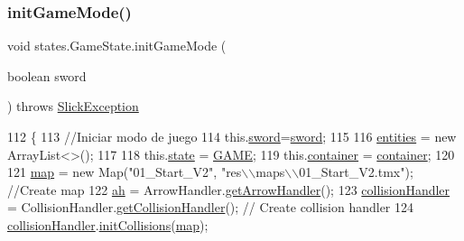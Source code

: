 \subsubsection{\texorpdfstring{init\+Game\+Mode()}{initGameMode()}}
{\footnotesize\ttfamily void states.\+Game\+State.\+init\+Game\+Mode (\begin{DoxyParamCaption}\item[{boolean}]{sword }\end{DoxyParamCaption}) throws \mbox{\hyperlink{classorg_1_1newdawn_1_1slick_1_1_slick_exception}{Slick\+Exception}}\hspace{0.3cm}{\ttfamily [inline]}}


\begin{DoxyCode}
112                                                                   \{
113         \textcolor{comment}{//Iniciar modo de juego}
114         this.\mbox{\hyperlink{classstates_1_1_game_state_af984dc048942d10169fb7127bcc30273}{sword}}=\mbox{\hyperlink{classstates_1_1_game_state_af984dc048942d10169fb7127bcc30273}{sword}};
115         
116         \mbox{\hyperlink{namespaceentities}{entities}} = \textcolor{keyword}{new} ArrayList<>();
117 
118         this.\mbox{\hyperlink{classstates_1_1_game_state_a5e07b1776e13d009e1a8c6a1e8140d04}{state}} = \mbox{\hyperlink{classstates_1_1_game_state_a8617f1d8be7bed020eeab9384e731bc6}{GAME}};
119         this.\mbox{\hyperlink{classstates_1_1_game_state_a88b0df4b57ada742c53e4e1ee3b25827}{container}} = \mbox{\hyperlink{classstates_1_1_game_state_a88b0df4b57ada742c53e4e1ee3b25827}{container}};
120 
121         \mbox{\hyperlink{classstates_1_1_game_state_ab5dc1b5f4f87c6fc5684832bfba3b939}{map}} = \textcolor{keyword}{new} Map(\textcolor{stringliteral}{"01\_Start\_V2"}, \textcolor{stringliteral}{"res\(\backslash\)\(\backslash\)maps\(\backslash\)\(\backslash\)01\_Start\_V2.tmx"}); \textcolor{comment}{//Create map}
122         \mbox{\hyperlink{classstates_1_1_game_state_ad403f3cc9e4c649012a647fe88ada09f}{ah}} = ArrowHandler.\mbox{\hyperlink{classitems_1_1weapons_1_1_arrow_handler_a67870bc30237b05a43008c330ec748ce}{getArrowHandler}}();
123         \mbox{\hyperlink{classstates_1_1_game_state_a7640e08453b2ce79066278d32d28ab63}{collisionHandler}} = CollisionHandler.\mbox{\hyperlink{classentities_1_1_collision_handler_a40a5776ef3782f3bfe037085dc1c10cf}{getCollisionHandler}}();    \textcolor{comment}{//
      Create collision handler}
124         \mbox{\hyperlink{classstates_1_1_game_state_a7640e08453b2ce79066278d32d28ab63}{collisionHandler}}.\mbox{\hyperlink{classentities_1_1_collision_handler_a7bf0999c216ce86964042ad3e836686e}{initCollisions}}(\mbox{\hyperlink{classstates_1_1_game_state_ab5dc1b5f4f87c6fc5684832bfba3b939}{map}});

\end{DoxyCode}
